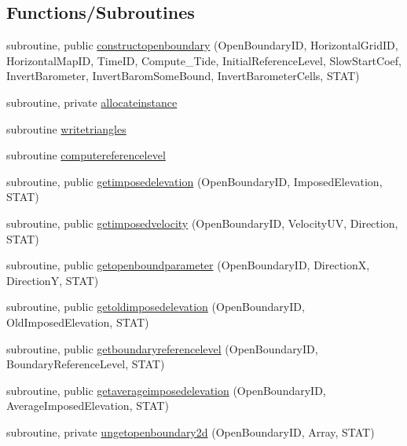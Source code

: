 \subsection*{Functions/\+Subroutines}
\begin{DoxyCompactItemize}
\item 
subroutine, public \mbox{\hyperlink{namespacemoduleopenboundary_a4de0cd486a833b86ff9e035de046ff81}{constructopenboundary}} (Open\+Boundary\+ID, Horizontal\+Grid\+ID, Horizontal\+Map\+ID, Time\+ID, Compute\+\_\+\+Tide, Initial\+Reference\+Level, Slow\+Start\+Coef, Invert\+Barometer, Invert\+Barom\+Some\+Bound, Invert\+Barometer\+Cells, S\+T\+AT)
\item 
subroutine, private \mbox{\hyperlink{namespacemoduleopenboundary_ae4ec1e1f3e6b488135fbc86abcef0fc0}{allocateinstance}}
\item 
subroutine \mbox{\hyperlink{namespacemoduleopenboundary_a0f8bf6cd86f964a155b3d7b4c3a54497}{writetriangles}}
\item 
subroutine \mbox{\hyperlink{namespacemoduleopenboundary_a4aaa938f269710f21fa7500a3501905a}{computereferencelevel}}
\item 
subroutine, public \mbox{\hyperlink{namespacemoduleopenboundary_a620ec04ba9bf0bef4684a93c01e856e3}{getimposedelevation}} (Open\+Boundary\+ID, Imposed\+Elevation, S\+T\+AT)
\item 
subroutine, public \mbox{\hyperlink{namespacemoduleopenboundary_a4770186a431ef5de9034a0b7eb410c43}{getimposedvelocity}} (Open\+Boundary\+ID, Velocity\+UV, Direction, S\+T\+AT)
\item 
subroutine, public \mbox{\hyperlink{namespacemoduleopenboundary_af306d4464c6cbd29390136a8103d1a2e}{getopenboundparameter}} (Open\+Boundary\+ID, DirectionX, DirectionY, S\+T\+AT)
\item 
subroutine, public \mbox{\hyperlink{namespacemoduleopenboundary_a0388d8cc14f0fdd9f898ff4cf751b093}{getoldimposedelevation}} (Open\+Boundary\+ID, Old\+Imposed\+Elevation, S\+T\+AT)
\item 
subroutine, public \mbox{\hyperlink{namespacemoduleopenboundary_a26e04e1ec6a8b2b4481ebb096e1c36b1}{getboundaryreferencelevel}} (Open\+Boundary\+ID, Boundary\+Reference\+Level, S\+T\+AT)
\item 
subroutine, public \mbox{\hyperlink{namespacemoduleopenboundary_a52848b363ed0632be0c32b49a6d17cd4}{getaverageimposedelevation}} (Open\+Boundary\+ID, Average\+Imposed\+Elevation, S\+T\+AT)
\item 
subroutine, private \mbox{\hyperlink{namespacemoduleopenboundary_a601c9cebbb40986b76e9488a0af4dc3a}{ungetopenboundary2d}} (Open\+Boundary\+ID, Array, S\+T\+AT)

\end{DoxyCompactItemize}
